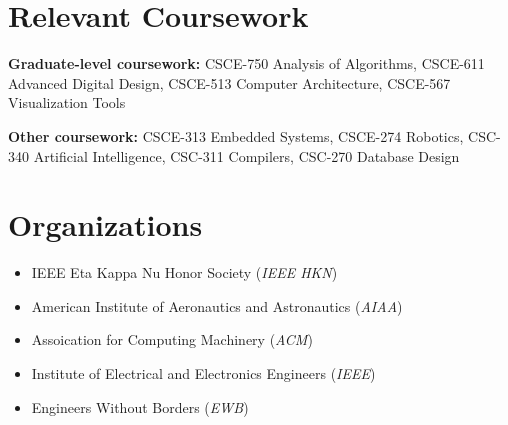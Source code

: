 \documentclass[letterpaper,11pt]{article}
\newcommand{\resumeOrganizationHeading}[2]{
  \vspace{-2pt}\item
    #1 (\textit{#2}) \\
}
\newcommand{\resumeSubHeadingListStart}{\begin{itemize}[leftmargin=0.15in, label={}]}
\newcommand{\resumeSubHeadingListEnd}{\end{itemize}}
\begin{document}
\section{Relevant Coursework}
  \vspace{2pt}
  \resumeSubHeadingListStart
    \small{\item{
        \textbf{Graduate-level coursework:}{ CSCE-750 Analysis of Algorithms, CSCE-611 Advanced Digital Design, CSCE-513 Computer Architecture, CSCE-567 Visualization Tools} \\ \vspace{3pt}
        
        \textbf{Other coursework:}{ CSCE-313 Embedded Systems, CSCE-274 Robotics, CSC-340 Artificial Intelligence, CSC-311 Compilers, CSC-270 Database Design}
    }}
  \resumeSubHeadingListEnd




    
    




\section{Organizations}
  \resumeSubHeadingListStart
    
    \resumeOrganizationHeading
      {IEEE Eta Kappa Nu Honor Society}{IEEE HKN}
    \resumeOrganizationHeading
      {American Institute of Aeronautics and Astronautics}{AIAA}
    \resumeOrganizationHeading
      {Assoication for Computing Machinery}{ACM}
    \resumeOrganizationHeading
      {Institute of Electrical and Electronics Engineers}{IEEE}
    \resumeOrganizationHeading
      {Engineers Without Borders}{EWB}
    
  \resumeSubHeadingListEnd




\end{document}

